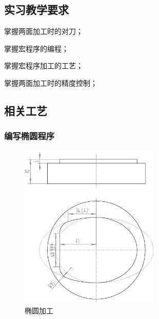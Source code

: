\jxhj{%
	}

\makeshouye %

\subsection{实习教学要求}
\begin{compactenum}[\hspace{2em}1、]
	\item 掌握两面加工时的对刀；
	\item 掌握宏程序的编程；
	\item 掌握宏程序加工的工艺；
    \item 掌握两面加工时的精度控制；
\end{compactenum}

\subsection{相关工艺}
\subsubsection{编写椭圆程序}
\begin{figure}[!hbtp]
	\centering	\includegraphics[width=0.6\textwidth]{images/shixi_1-1}
	\caption{椭圆加工} \label{椭圆加工}
\end{figure}

